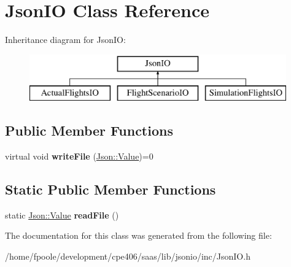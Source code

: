 \hypertarget{class_json_i_o}{}\section{Json\+I\+O Class Reference}
\label{class_json_i_o}
Inheritance diagram for Json\+I\+O\+:\begin{figure}[H]
\begin{center}
\leavevmode
\includegraphics[height=2.000000cm]{class_json_i_o}
\end{center}
\end{figure}
\subsection*{Public Member Functions}
\begin{DoxyCompactItemize}
\item 
\hypertarget{class_json_i_o_af6f8a61815323ac89752b5365fb2acab}{}virtual void {\bfseries write\+File} (\hyperlink{class_json_1_1_value}{Json\+::\+Value})=0\label{class_json_i_o_af6f8a61815323ac89752b5365fb2acab}

\end{DoxyCompactItemize}
\subsection*{Static Public Member Functions}
\begin{DoxyCompactItemize}
\item 
\hypertarget{class_json_i_o_a95a39d392f3f27bb94dc5ad5ef3dba19}{}static \hyperlink{class_json_1_1_value}{Json\+::\+Value} {\bfseries read\+File} ()\label{class_json_i_o_a95a39d392f3f27bb94dc5ad5ef3dba19}

\end{DoxyCompactItemize}


The documentation for this class was generated from the following file\+:\begin{DoxyCompactItemize}
\item 
/home/fpoole/development/cpe406/saas/lib/jsonio/inc/Json\+I\+O.\+h\end{DoxyCompactItemize}
